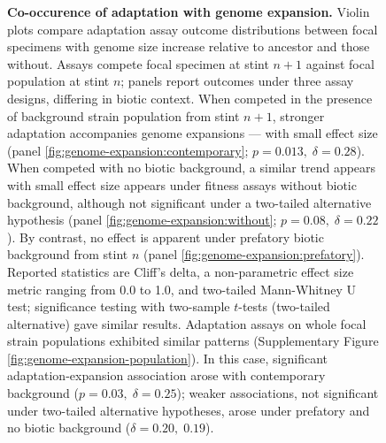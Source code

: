 \begin{figure}
\caption{
    \textbf{Co-occurence of adaptation with genome expansion.}
    \footnotesize
    Violin plots compare adaptation assay outcome distributions between focal specimens with genome size increase relative to ancestor and those without.
    Assays compete focal specimen at stint $n+1$ against focal population at stint $n$;
    panels report outcomes under three assay designs, differing in biotic context.
    When competed in the presence of background strain population from stint $n+1$, stronger adaptation accompanies genome expansions --- with small effect size (panel \ref{fig:genome-expansion:contemporary}; $p = 0.013, \; \delta = 0.28$).
    When competed with no biotic background, a similar trend appears with small effect size appears under fitness assays without biotic background, although not significant under a two-tailed alternative hypothesis (panel \ref{fig:genome-expansion:without}; $p=0.08, \; \delta = 0.22$).
    By contrast, no effect is apparent under prefatory biotic background from stint $n$ (panel \ref{fig:genome-expansion:prefatory}).
    Reported statistics are Cliff's delta, a non-parametric effect size metric ranging from 0.0 to 1.0, and two-tailed Mann-Whitney U test; significance testing with two-sample $t$-tests (two-tailed alternative) gave similar results.
    Adaptation assays on whole focal strain populations exhibited similar patterns (Supplementary Figure \ref{fig:genome-expansion-population}).
    In this case, significant adaptation-expansion association arose with contemporary background ($p=0.03, \; \delta=0.25$);
    weaker associations, not significant under two-tailed alternative hypotheses, arose under prefatory and no biotic background ($\delta=0.20,\; 0.19$).
}
\label{fig:genome-expansion}

\end{figure}
